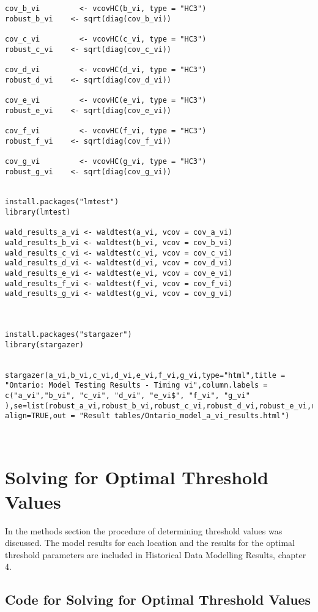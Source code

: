 \begin{lstlisting}
cov_b_vi         <- vcovHC(b_vi, type = "HC3")
robust_b_vi    <- sqrt(diag(cov_b_vi))

cov_c_vi         <- vcovHC(c_vi, type = "HC3")
robust_c_vi    <- sqrt(diag(cov_c_vi))

cov_d_vi         <- vcovHC(d_vi, type = "HC3")
robust_d_vi    <- sqrt(diag(cov_d_vi))

cov_e_vi         <- vcovHC(e_vi, type = "HC3")
robust_e_vi    <- sqrt(diag(cov_e_vi))

cov_f_vi         <- vcovHC(f_vi, type = "HC3")
robust_f_vi    <- sqrt(diag(cov_f_vi))

cov_g_vi         <- vcovHC(g_vi, type = "HC3")
robust_g_vi    <- sqrt(diag(cov_g_vi))


install.packages("lmtest")
library(lmtest)

wald_results_a_vi <- waldtest(a_vi, vcov = cov_a_vi)
wald_results_b_vi <- waldtest(b_vi, vcov = cov_b_vi)
wald_results_c_vi <- waldtest(c_vi, vcov = cov_c_vi)
wald_results_d_vi <- waldtest(d_vi, vcov = cov_d_vi)
wald_results_e_vi <- waldtest(e_vi, vcov = cov_e_vi)
wald_results_f_vi <- waldtest(f_vi, vcov = cov_f_vi)
wald_results_g_vi <- waldtest(g_vi, vcov = cov_g_vi)



install.packages("stargazer")
library(stargazer)


stargazer(a_vi,b_vi,c_vi,d_vi,e_vi,f_vi,g_vi,type="html",title = "Ontario: Model Testing Results - Timing vi",column.labels = c("a_vi","b_vi", "c_vi", "d_vi", "e_vi$", "f_vi", "g_vi" ),se=list(robust_a_vi,robust_b_vi,robust_c_vi,robust_d_vi,robust_e_vi,robust_f_vi,robust_g_vi), align=TRUE,out = "Result tables/Ontario_model_a_vi_results.html")



\end{lstlisting}



\section{Solving for Optimal Threshold Values}

In the methods section the procedure of determining threshold values was discussed. The model results for each location and the results for the optimal threshold parameters are included in Historical Data Modelling Results, chapter 4.


\subsection{Code for Solving for Optimal Threshold Values}

